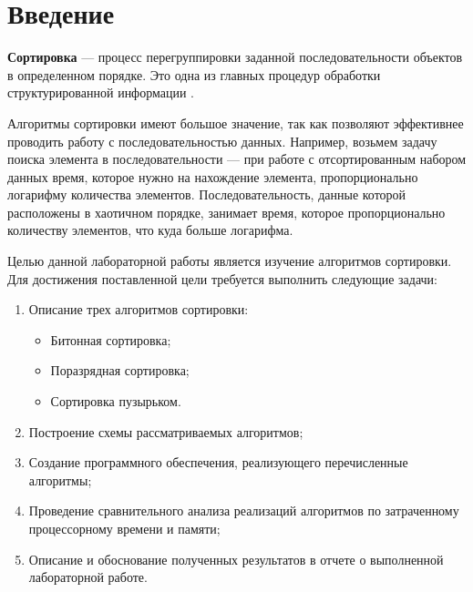 \chapter*{Введение}

\textbf{Сортировка} --- процесс перегруппировки заданной последовательности объектов в определенном порядке. Это одна из главных процедур обработки структурированной информации \cite{sort0}.

Алгоритмы сортировки имеют большое значение, так как позволяют эффективнее проводить работу с последовательностью данных. Например, возьмем задачу поиска элемента в последовательности --- при работе с отсортированным набором данных время, которое нужно на нахождение элемента, пропорционально логарифму количества элементов. Последовательность, данные которой расположены в хаотичном порядке, занимает время, которое пропорционально количеству элементов, что куда больше логарифма.

Целью данной лабораторной работы является изучение алгоритмов сортировки. Для достижения поставленной цели требуется выполнить следующие задачи:

\begin{enumerate}[label={\arabic*)}]
	\item Описание трех алгоритмов сортировки:
		\begin{itemize}
			\item Битонная сортировка;
			\item Поразрядная сортировка;
			\item Сортировка пузырьком.
		\end{itemize}
	\item Построение схемы рассматриваемых алгоритмов;
	\item Создание программного обеспечения, реализующего перечисленные алгоритмы;
	\item Проведение сравнительного анализа реализаций алгоритмов по затраченному процессорному времени и памяти;
	\item Описание и обоснование полученных результатов в отчете о выполненной лабораторной работе.
\end{enumerate}